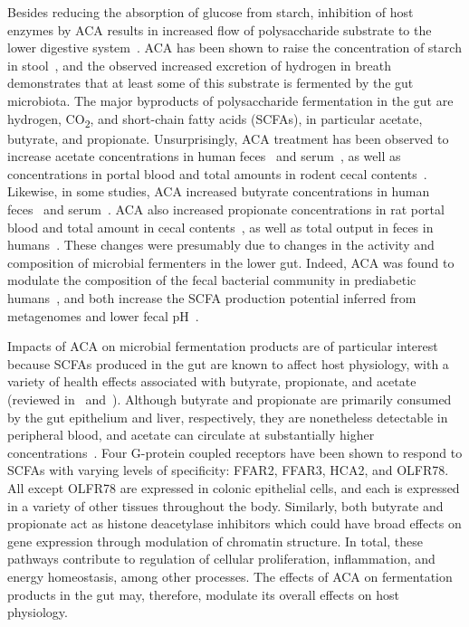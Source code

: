 \documentclass{doc/template/bmcart-nofigbox}
\begin{document}
Besides reducing the absorption of glucose from starch,
inhibition of host enzymes by ACA results in increased flow of polysaccharide
substrate to the lower digestive system~\cite{Dehghan-Kooshkghazi2004}.
ACA has been shown to raise the concentration of starch in stool~\cite{Weaver1997, Dehghan-Kooshkghazi2004},
and the observed increased excretion of hydrogen in
breath~\cite{Hiele1992, Seifarth1998, Qualmann1995, Jenkins1981, Weaver2000} demonstrates
that at least some of this substrate is fermented by the gut microbiota.
The major byproducts of polysaccharide fermentation in the gut are hydrogen,
CO\textsubscript{2}, and short-chain fatty acids (SCFAs), in particular acetate, butyrate,
and propionate.
Unsurprisingly, ACA treatment has been observed to
increase acetate concentrations in human feces~\cite{Holt1996} and
serum~\cite{Wolever2000}, as well as concentrations in portal blood and total
amounts in rodent cecal contents~\cite{Dehghan-Kooshkghazi2004}.
Likewise, in some studies, ACA increased butyrate concentrations in human
feces~\cite{Weaver1997, Weaver2000, Wolin1999} and serum~\cite{Wolever2000}.
ACA also increased propionate concentrations in rat portal blood and total
amount in cecal contents~\cite{Dehghan-Kooshkghazi2004},
as well as total output in feces in humans~\cite{Holt1996}.
These changes were presumably due to changes in the activity and composition
of microbial fermenters in the lower gut.
Indeed, ACA was found to modulate the composition of the fecal bacterial
community in prediabetic humans~\cite{Zhang2017},
and both increase the SCFA production potential inferred
from metagenomes and lower fecal pH~\cite{Zhao2018}.

Impacts of ACA on microbial fermentation products are of
particular interest because SCFAs produced in the gut are known to affect host
physiology, with a variety of health effects associated with butyrate,
propionate, and acetate (reviewed in~\cite{Koh2016} and~\cite{Kasubuchi2015}).
Although butyrate and propionate are primarily consumed by the gut epithelium
and liver, respectively, they are nonetheless detectable in peripheral blood,
and acetate can circulate at substantially higher concentrations~\cite{Wolever1996}.
Four G-protein coupled receptors have been shown to respond to SCFAs with
varying levels of specificity:
FFAR2, FFAR3, HCA2, and OLFR78.
All except OLFR78 are expressed in colonic epithelial cells, and each is
expressed in a variety of other tissues throughout the body.
Similarly, both butyrate and propionate act as histone deacetylase inhibitors
which could have broad effects on gene expression through modulation of
chromatin structure.
In total, these pathways contribute to regulation of cellular proliferation,
inflammation, and energy homeostasis, among other processes.
The effects of ACA on fermentation products in the gut may, therefore,
modulate its overall effects on host physiology.
\end{document}
